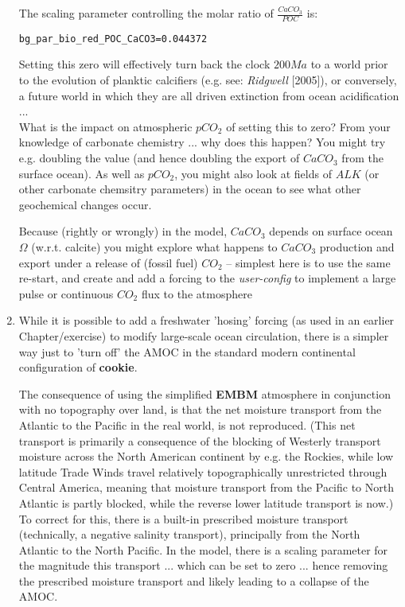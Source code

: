 \begin{enumerate}[noitemsep]
\vspace{1mm}
The scaling parameter controlling the molar ratio of \(\frac{CaCO_{3}}{POC}\) is:
\vspace{-1pt}\small\begin{verbatim}
bg_par_bio_red_POC_CaCO3=0.044372
\end{verbatim}\normalsize\vspace{-1pt}
Setting this zero will effectively turn back the clock \(200Ma\) to a world prior to the evolution of planktic calcifiers (e.g. see: \textit{Ridgwell} [2005]), or conversely, a future world in which they are all driven extinction from ocean acidification ... 
\vspace{1mm}
\\What is the impact on atmospheric \(pCO_{2}\) of setting this to zero? From your knowledge of carbonate chemistry ... why does this happen? You might try e.g. doubling the value (and hence doubling the export of \(CaCO_{3}\) from the surface ocean). As well as \(pCO_{2}\), you might also look at fields of \(ALK\) (or other carbonate chemsitry parameters) in the ocean to see what other geochemical changes occur.

Because (rightly or wrongly) in the model, \(CaCO_{3}\) depends on surface ocean \(\Omega\) (w.r.t. calcite) you might explore what happens to \(CaCO_{3}\) production and export under a release of (fossil fuel) \(CO_{2}\) -- simplest here is to use the same re-start, and create and add a forcing to the \textit{user-config} to implement a large pulse or continuous \(CO_{2}\) flux to the atmosphere

\newpage
%
\item While it is possible to add a freshwater 'hosing' forcing (as used in an earlier Chapter/exercise) to modify large-scale ocean circulation, there is a simpler way just to 'turn off' the AMOC in the standard modern continental configuration of \textbf{cookie}.

\vspace{1mm}
The consequence of using the simplified \textbf{EMBM} atmosphere in conjunction with no topography over land, is that the net moisture transport from the Atlantic to the Pacific in the real world, is not reproduced. (This net transport is primarily a consequence of the blocking of Westerly transport moisture across the North American continent by e.g. the Rockies, while low latitude Trade Winds travel relatively topographically unrestricted through Central America, meaning that moisture transport from the Pacific to North Atlantic is partly blocked, while the reverse lower latitude transport is now.) To correct for this, there is a built-in prescribed moisture transport (technically, a negative salinity transport), principally from the North Atlantic to the North Pacific. In the model, there is a scaling parameter for the magnitude this transport ... which can be set to zero ... hence removing the prescribed moisture transport and likely leading to a collapse of the AMOC.


\end{enumerate}
